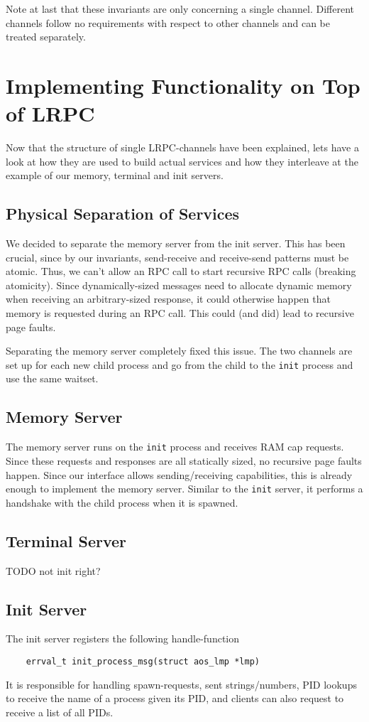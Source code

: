 Note at last that these invariants are only concerning a single channel.
Different channels follow no requirements with respect to other channels 
and can be treated separately.

\section{Implementing Functionality on Top of LRPC}
Now that the structure of single LRPC-channels have been explained, 
lets have a look at how they are used to build actual services and how 
they interleave at the example of our memory, terminal and init servers.

\subsection{Physical Separation of Services}
We decided to separate the memory server from the init server.
This has been crucial, since by our invariants, send-receive and receive-send 
patterns must be atomic. Thus, we can't allow an RPC call to 
start recursive RPC calls (breaking atomicity). Since dynamically-sized messages 
need to allocate dynamic memory when receiving an arbitrary-sized response, 
it could otherwise happen that memory is requested during an RPC call.
This could (and did) lead to recursive page faults.

Separating the memory server completely fixed this issue.
The two channels are set up for each new child process and go from the child to the 
\texttt{init} process and use the same waitset.

\subsection{Memory Server}
The memory server runs on the \texttt{init} process and receives RAM cap requests.
Since these requests and responses are all statically sized, no recursive page faults 
happen. Since our interface allows sending/receiving capabilities, this 
is already enough to implement the memory server.
Similar to the \texttt{init} server, it performs a handshake with the child process
when it is spawned. 
\subsection{Terminal Server}
TODO not init right?
\subsection{Init Server}
The init server registers the following handle-function 
\begin{verbatim}
    errval_t init_process_msg(struct aos_lmp *lmp)
\end{verbatim}
It is responsible for handling spawn-requests, sent strings/numbers, PID lookups to receive 
the name of a process given its PID, and clients can also request to receive a list of all PIDs.

